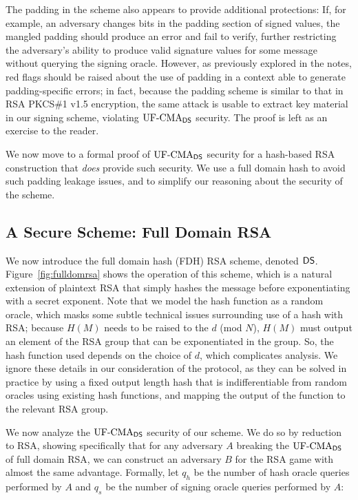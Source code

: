 The padding in the scheme also appears to provide additional protections: If, for example, an adversary changes bits in the padding section of signed values, the mangled padding should produce an error and fail to verify, further restricting the adversary's ability to produce valid signature values for some message without querying the signing oracle.  However, as previously explored in the notes, red flags should be raised about the use of padding in a context able to generate padding-specific errors; in fact, because the padding scheme is similar to that in RSA PKCS\#1 v1.5 encryption, the same attack is usable to extract key material in our signing scheme, violating $\textnormal{UF-CMA}_{{\mathsf{DS}}}$ security.  The proof is left as an exercise to the reader.

We now move to a formal proof of $\textnormal{UF-CMA}_{{\mathsf{DS}}}$ security for a hash-based RSA construction that \emph{does} provide such security.  We use a full domain hash to avoid such padding leakage issues, and to simplify our reasoning about the security of the scheme.

\subsection{A Secure Scheme: Full Domain RSA}


We now introduce the full domain hash (FDH) RSA scheme, denoted ${\mathsf{DS}}$.  Figure~\ref{fig:fulldomrsa} shows the operation of this scheme, which is a natural extension of plaintext RSA that simply hashes the message before exponentiating with a secret exponent.  Note that we model the hash function as a random oracle, which masks some subtle technical issues surrounding use of a hash with RSA; because $H(M)$ needs to be raised to the $d$ (mod $N$), $H(M)$ must output an element of the RSA group that can be exponentiated in the group.  So, the hash function used depends on the choice of $d$, which complicates analysis.  We ignore these details in our consideration of the protocol, as they can be solved in practice by using a fixed output length hash that is indifferentiable from random oracles using existing hash functions, and mapping the output of the function to the relevant RSA group.

We now analyze the $\textnormal{UF-CMA}_{\mathsf{DS}}$ security of our scheme.  We do so by reduction to RSA, showing specifically that for any adversary $A$ breaking the $\textnormal{UF-CMA}_{\mathsf{DS}}$ of full domain RSA, we can construct an adversary $B$ for the RSA game with almost the same advantage.  Formally, let $q_h$ be the number of hash oracle queries performed by $A$ and $q_s$ be the number of signing oracle queries performed by $A$:

